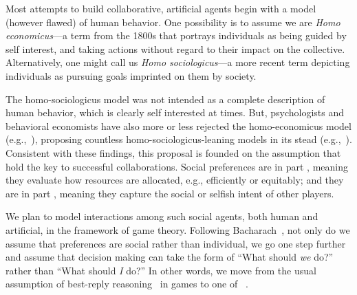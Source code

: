 Most attempts to build collaborative, artificial agents begin with a
model (however flawed) of human behavior.
%
One possibility is to assume we are \emph{Homo economicus}---a term
from the 1800s that portrays individuals as being guided by self interest,
and taking actions without regard to their impact on the collective.
Alternatively, one might call us \emph{Homo
  sociologicus}---a more recent term depicting individuals as pursuing
goals imprinted on them by society.

The homo-sociologicus model was not intended as a complete description
of human behavior, which is clearly self interested at times.  But,
psychologists and behavioral economists have also more or less
rejected the homo-economicus model (e.g.,~\cite{kahnemanst82}),
proposing countless homo-sociologicus-leaning models in its
stead (e.g.,~\cite{blanco11,falk2003nature,fehr1999theory,fehr2006economics,fisman07,forsythe94,kahneman86}).
%
Consistent with these findings, this proposal is founded on the
assumption that 
 hold the key to successful collaborations.
%
Social preferences are in part , meaning they
evaluate how resources are allocated, e.g., efficiently or equitably;
and they are in part , meaning they capture the
social or selfish intent of other players.

We plan to model interactions among such social agents, both human and
artificial, in the framework of game theory.  
%
Following Bacharach~\cite{bacharach2006beyond}, not only do we assume
that preferences are social rather than individual, we go one step
further and assume that decision making can take the form of ``What
should \emph{we\/} do?'' rather than ``What should \emph{I\/} do?''
In other words, we move from the usual assumption of best-reply
reasoning~\cite{cournot} in games to one of ~\cite{RePEc:eee:reecon:v:53:y:1999:i:2:p:117-147}.

